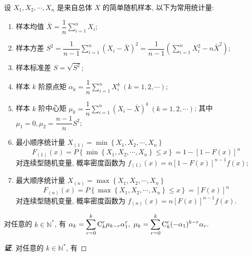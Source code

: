 \begin{definition}[常用统计量]
    设 $ X_{1}, X_{2}, \cdots, X_{n} $ 是来自总体 $ X $ 的简单随机样本, 以下为常用统计量:
    \begin{enumerate}[label=(\arabic{*})]
        \item 样本均值 $ \bar{X}=\dfrac{1}{n} \displaystyle\sum_{i=1}^{n} X_{i} $;
        \item 样本方差 $S^{2}=\dfrac{1}{n-1} \displaystyle\sum_{i=1}^{n}\left(X_{i}-\bar{X}\right)^{2}=\dfrac{1}{n-1}\left(\displaystyle\sum_{i=1}^{n} X_{i}^{2}-n \bar{X}^{2}\right) $;
        \item 样本标准差 $ S=\sqrt{S^{2}} $;
        \item 样本 $ k $ 阶原点矩 $\alpha_{k}=\dfrac{1}{n} \displaystyle\sum_{i=1}^{n} X_{i}^{k}~(k=1,2, \cdots) $;
        \item 样本 $ k $ 阶中心矩 $\mu_{k}=\dfrac{1}{n} \displaystyle\sum_{i=1}^{n}\left(X_{i}-\bar{X}\right)^{k}~(k=1,2, \cdots) $;
        其中 $ \mu_{1}=0, \mu_{2}=\dfrac{n-1}{n} S^{2} $;
        \item 最小顺序统计量 $X_{(1)}=\min \left\{X_{1}, X_{2}, \cdots, X_{n}\right\}$
        $$F_{(1)}(x)=P\left\{\min \left\{X_{1}, X_{2}, \cdots, X_{n}\right\} \leqslant x\right\}=1-[1-F(x)]^{n}$$
        对连续型随机变量, 概率密度函数为 $f_{(1)}(x)=n[1-F(x)]^{n-1} f(x) $;
        \item 最大顺序统计量 $X_{(n)}=\max \left\{X_{1}, X_{2}, \cdots, X_{n}\right\}$
        $$F_{(n)}(x)=P\left\{\max \left\{X_{1}, X_{2}, \cdots, X_{n}\right\} \leqslant x\right\}=[F(x)]^{n}$$
        对连续型随机变量, 概率密度函数为 $f_{(n)}(x)=n[F(x)]^{n-1} f(x) .$
    \end{enumerate}
\end{definition}
\begin{theorem}[样本中心矩与原点矩的转换]
    对任意的 $k\in \mathbb{N}^*$, 有  $\displaystyle \alpha_k=\sum_{r=0}^{k} \mathrm{C}_k^r\mu_{k-r}\alpha_1^r,~\mu_k=\sum_{r=0}^{k} \mathrm{C}_k^r(-\alpha_1)^{k-r}\alpha_r.$
\end{theorem}
\begin{proof}[{\songti \textbf{证}}]
    对任意的 $k\in \mathbb{N}^*$, 有
\end{proof}

